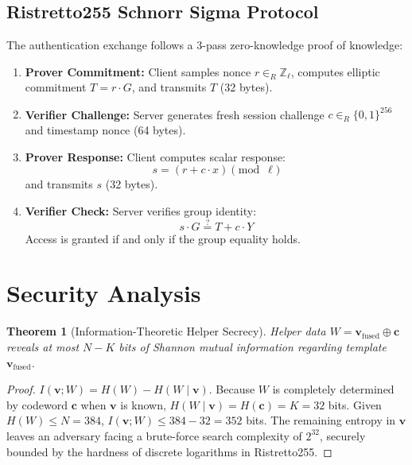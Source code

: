 \documentclass[conference]{IEEEtran}
\newtheorem{theorem}{Theorem}
\begin{document}
\subsection{Ristretto255 Schnorr Sigma Protocol}
The authentication exchange follows a 3-pass zero-knowledge proof of knowledge:
\begin{enumerate}
    \item \textbf{Prover Commitment:} Client samples nonce $r \in_R \mathbb{Z}_\ell$, computes elliptic commitment $T = r \cdot G$, and transmits $T$ (32 bytes).
    \item \textbf{Verifier Challenge:} Server generates fresh session challenge $c \in_R \{0, 1\}^{256}$ and timestamp nonce (64 bytes).
    \item \textbf{Prover Response:} Client computes scalar response:
    \begin{equation}
    s = (r + c \cdot x) \pmod \ell
    \end{equation}
    and transmits $s$ (32 bytes).
    \item \textbf{Verifier Check:} Server verifies group identity:
    \begin{equation}
    s \cdot G \stackrel{?}{=} T + c \cdot Y
    \end{equation}
    Access is granted if and only if the group equality holds.
\end{enumerate}

\section{Security Analysis}

\begin{theorem}[Information-Theoretic Helper Secrecy]
Helper data $W = \mathbf{v}_{\text{fused}} \oplus \mathbf{c}$ reveals at most $N - K$ bits of Shannon mutual information regarding template $\mathbf{v}_{\text{fused}}$.
\end{theorem}
\begin{proof}
$I(\mathbf{v}; W) = H(W) - H(W \mid \mathbf{v})$. Because $W$ is completely determined by codeword $\mathbf{c}$ when $\mathbf{v}$ is known, $H(W \mid \mathbf{v}) = H(\mathbf{c}) = K = 32$ bits. Given $H(W) \le N = 384$, $I(\mathbf{v}; W) \le 384 - 32 = 352$ bits. The remaining entropy in $\mathbf{v}$ leaves an adversary facing a brute-force search complexity of $2^{32}$, securely bounded by the hardness of discrete logarithms in Ristretto255.
\end{proof}
\end{document}
